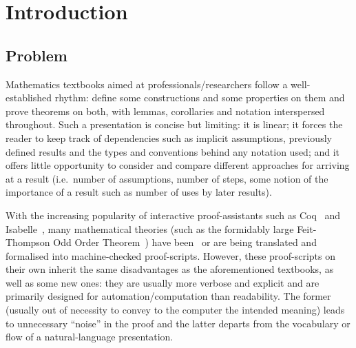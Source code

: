 \chapter{Introduction}




\section{Problem}

Mathematics textbooks aimed at professionals/researchers follow a well-established
rhythm: define some constructions and some properties on them and prove
theorems on both, with lemmas, corollaries and notation interspersed
throughout. Such a presentation is concise but limiting: it is linear; it forces
the reader to keep track of dependencies such as implicit assumptions, previously
defined results and the types and conventions behind any notation used;
and it offers little opportunity to consider and compare different approaches
for arriving at a result (i.e.\ number of assumptions, number of steps, some
notion of the importance of a result such as number of uses by later
results).

With the increasing popularity of interactive proof-assistants such as
Coq~\cite{Coq:manual} and Isabelle~\cite{nipkow2002isabelle}, many mathematical
theories (such as the formidably large Feit-Thompson Odd Order
Theorem~\cite{peterfalvi2000oot, bender1994oot}) have
been~\cite{gonthier2013oot} or are being translated and formalised into
machine-checked proof-scripts. However, these proof-scripts on their own
inherit the same disadvantages as the aforementioned textbooks, as well as some
new ones: they are usually more verbose and explicit and are primarily designed
for automation/computation than readability. The former (usually out of
necessity to convey to the computer the intended meaning) leads to unnecessary
``noise'' in the proof and the latter departs from the vocabulary or flow of a
natural-language presentation.

